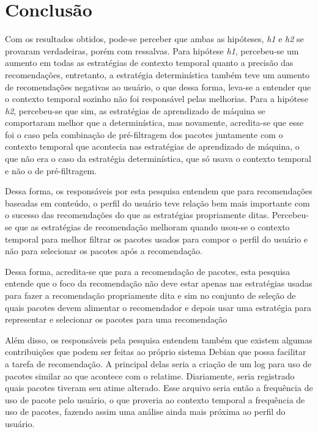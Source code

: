 \chapter[Conclusão]{Conclusão}

Com os resultados obtidos, pode-se perceber que ambas as hipóteses, \textit{h1}
e \textit{h2} se provaram verdadeiras, porém com ressalvas. Para hipótese
\textit{h1}, percebeu-se um aumento em todas as estratégias de contexto
temporal quanto a precisão das recomendações, entretanto, a estratégia
determinística também teve um aumento de recomendações negativas ao usuário, o
que dessa forma, leva-se a entender que o contexto temporal sozinho não foi
responsável pelas melhorias. Para a hipótese \textit{h2}, percebeu-se que sim,
as estratégias de aprendizado de máquina se comportaram melhor que a
determinística, mas novamente, acredita-se que esse foi o caso pela combinação
de pré-filtragem dos pacotes juntamente com o contexto temporal que acontecia
nas estratégias de aprendizado de máquina, o que não era o caso da estratégia
determinística, que só usava o contexto temporal e não o de pré-filtragem.

Dessa forma, os responsáveis por esta pesquisa entendem que para recomendações
baseadas em conteúdo, o perfil do usuário teve relação bem mais importante com o
sucesso das recomendações do que as estratégias propriamente ditas. Percebeu-se
que as estratégias de recomendação melhoram quando usou-se o contexto temporal
para melhor filtrar os pacotes usados para compor o perfil do usuário e não para
selecionar os pacotes após a recomendação.

Dessa forma, acredita-se que para a recomendação de pacotes, esta pesquisa
entende que o foco da recomendação não deve estar apenas nas estratégias usadas
para fazer a recomendação propriamente dita e sim no conjunto de seleção de
quais pacotes devem alimentar o recomendador e depois usar uma estratégia
para representar e selecionar os pacotes para uma recomendação

Além disso, os responsáveis pela pesquisa entendem também que existem algumas
contribuições que podem ser feitas ao próprio sistema Debian que possa facilitar
a tarefa de recomendação. A principal delas seria a criação de um log para uso de
pacotes similar ao que acontece com o relatime. Diariamente, seria registrado
quais pacotes tiveram seu atime alterado. Esse arquivo seria então a frequência
de uso de pacote pelo usuário, o que proveria ao contexto temporal a frequência
de uso de pacotes, fazendo assim uma análise ainda mais próxima ao perfil do
usuário.

